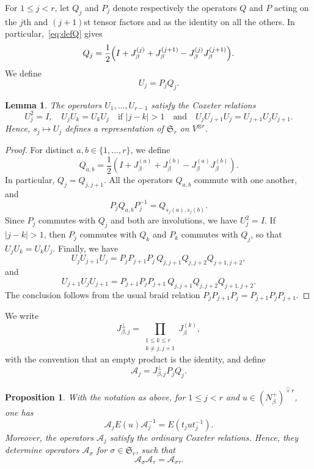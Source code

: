 \documentclass[reqno]{amsart}
\newcommand{\sym}{\mathfrak{S}}
\newtheorem{lemma}[theorem]{Lemma}     %
\newtheorem{proposition}[theorem]{Proposition}
\theoremstyle{definition}
\begin{document}
For $1\leq j<r$, let $Q_j$ and $P_j$ denote respectively the operators
$Q$ and $P$ acting on the $j$th and $(j+1)$st tensor factors and as the
identity on all the others. In particular,~\eqref{eq:defQ} gives
\[
Q_j
=
\frac12\Bigl(
I+J_\beta^{(j)}+J_\beta^{(j+1)}
-J_\beta^{(j)}J_\beta^{(j+1)}
\Bigr).
\]
We define 
$$
U_j=P_jQ_j.$$

\begin{lemma}
\label{lem:coxUi}
The operators $U_1,\ldots,U_{r-1}$ satisfy the Coxeter relations
\[
U_j^2=I,\quad
U_jU_k=U_kU_j\quad\text{if }|j-k|>1
\quad\text{and}\quad
U_jU_{j+1}U_j
=
U_{j+1}U_jU_{j+1}.
\]
Hence, $s_j\mapsto U_j$ defines a representation of
$\sym_r$ on $V^{\otimes r}$.
\end{lemma}

\begin{proof}
For distinct $a,b\in\{1,\ldots,r\}$, we define
$$Q_{a,b}=\frac{1}{2}(I+J_\beta^{(a)} + J_\beta^{(b)} -
J_\beta^{(a)}J_\beta^{(b)}).$$
In particular, $Q_j=Q_{j,j+1}$. All the operators $Q_{a,b}$ commute with one
another, and 
\[
P_jQ_{a,b}P_j^{-1}
=
Q_{s_j(a),s_j(b)}.
\]
Since $P_j$ commutes with $Q_j$ and both are involutions, we have
$U_j^2=I$.
If $|j-k|>1$, then $P_j$ commutes with $Q_k$ and $P_k$ commutes with
$Q_j$, so that $ U_jU_k=U_kU_j$.
Finally, we have
\[
U_jU_{j+1}U_j
=
P_jP_{j+1}P_j\,
Q_{j,j+1}Q_{j,j+2}Q_{j+1,j+2},
\]
and
\[
U_{j+1}U_jU_{j+1}
=
P_{j+1}P_jP_{j+1}\,
Q_{j,j+1}Q_{j,j+2}Q_{j+1,j+2}.
\]
The conclusion follows from the usual braid relation
$
P_jP_{j+1}P_j
=
P_{j+1}P_jP_{j+1}$.
\end{proof}

We write
\[
J_{\beta,j}^{\perp}
=
\prod_{\substack{1\leq k\leq r\\ k\neq j,j+1}}
J_\beta^{(k)},
\]
with the convention that an empty product is the identity, and define
\begin{equation}
\label{eq:defAj}
\mathcal A_j= J_{\beta,j}^{\perp}P_jQ_j.
\end{equation}

\begin{proposition} 
With the notation as above, for $1\leq j<r$ and $u\in
(N_\beta^+)^{\widehat{\times} r}$, one has
\[
\mathcal A_j E(u)\mathcal A_j^{-1}
=
E(t_jut_j^{-1}).
\]
Moreover, the operators $\mathcal A_j$ satisfy the ordinary Coxeter
relations. Hence, they determine operators $\mathcal A_\sigma$ for
$\sigma\in\sym_r$, such that
\begin{equation}
\label{eq:relcoxAsigma}
\mathcal A_\sigma\mathcal A_\tau
=
\mathcal A_{\sigma\tau}.
\end{equation}
\end{proposition}
\end{document}
